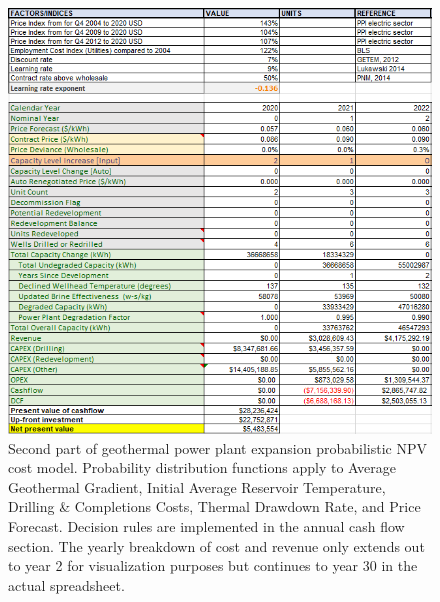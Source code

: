 \begin{figure}[H]
\centering
\includegraphics[width=\textwidth]{templates/images/Figure-Flexible_Model_SheetB.png}
\caption[Probabilistic cost model worksheet (part 2)]{Second part of geothermal power plant expansion probabilistic NPV cost model. Probability distribution functions apply to Average Geothermal Gradient, Initial Average Reservoir Temperature, Drilling \& Completions Costs, Thermal Drawdown Rate, and Price Forecast. Decision rules are implemented in the annual cash flow section. The yearly breakdown of cost and revenue only extends out to year 2 for visualization purposes but continues to year 30 in the actual spreadsheet.}
\label{fig:probabilistic_model_sheet2}
\end{figure}